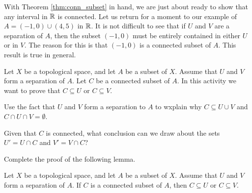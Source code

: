 
With Theorem \ref{thm:conn_subset} in hand, we are just about ready to show that any interval in $\mathbb{R}$ is connected. Let us return for a moment to our example of $A = (-1,0) \cup (4,5)$ in $\mathbb{R}$. It is not difficult to see that if $U$ and $V$ are a separation of $A$, then the subset $(-1,0)$ must be entirely contained in either $U$ or in $V$. The reason for this is that $(-1,0)$ is a connected subset of $A$. This result is true in general.

\begin{activity} Let $X$ be a topological space, and let $A$ be a subset of $X$. Assume that $U$ and $V$ form a separation of $A$. Let $C$ be a connected subset of $A$. In this activity we want to prove that $C \subseteq U$ or $C \subseteq V$. 
\ba

\item Use the fact that $U$ and $V$ form a separation to $A$ to wxplain why $C \subseteq U \cup V$ and $C \cap U \cap V = \emptyset$. 

\item Given that $C$ is connected, what conclusion can we draw about the sets $U' = U \cap C$ and $V' = V \cap C$?

\item Complete the proof of the following lemma.

\begin{lemma} \label{lem:separation_subset} Let $X$ be a topological space, and let $A$ be a subset of $X$. Assume that $U$ and $V$ form a separation of $A$. If $C$ is a connected subset of $A$, then $C \subseteq U$ or $C \subseteq V$. 
\end{lemma}

\ea

\end{activity}

\begin{comment}

\ActivitySolution

\ba
\item Since $U$ and $V$ form a separation of $A$, we know that $A \subseteq U \cup V$ and $U \cap V \cap A = \emptyset$. Then $C \subseteq A \subseteq U \cup V$ and $U \cap V \cap C \subseteq U \cap V \cap A = \emptyset$.

\item If $U' = U \cap C \neq \emptyset$ and $V' = V \cap C \neq \emptyset$, then $U$ and $V$ form a separation of $C$. But $C$ is connected, so this is impossible. We conclude that either $U' = \emptyset$ or $V' = \emptyset$

\item If $U' = U \cap C= \emptyset$, the fact that $C \subseteq U \cup V$ implies that $C \subseteq V$. Similarly, if $V' = V \cap C = \emptyset$, then $C \subseteq U$. We conclude that $C \subseteq U$ or $C \subseteq V$.

\ea

\end{comment}

